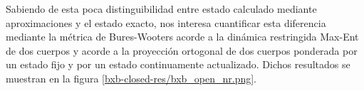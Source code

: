 \documentclass{report} %
\numberwithin{equation}{section}
\begin{document}
Sabiendo de esta poca distinguibilidad entre estado calculado mediante aproximaciones y el estado exacto, nos interesa cuantificar esta diferencia mediante la métrica de Bures-Wooters acorde a la dinámica restringida Max-Ent de dos cuerpos y acorde a la proyección ortogonal de dos cuerpos ponderada por un estado fijo y por un estado continuamente actualizado. Dichos resultados se muestran en la figura 
\ref{bxb-closed-res/bxb_open_nr.png}. 

\begin{figure}
\begin{minipage}{.5\linewidth}
\centering
{}
\end{minipage}%
\begin{minipage}{.5\linewidth}
\centering
{}
\end{minipage}\par\medskip
\centering
{}

\end{figure}
\end{document}
